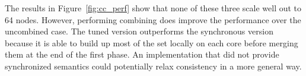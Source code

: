 The results in Figure~\ref{fig:cc_perf} show that none of these three scale well out to 64 nodes. However, performing combining does improve the performance over the uncombined case. The tuned version outperforms the synchronous version because it is able to build up most of the set locally on each core before merging them at the end of the first phase. An implementation that did not provide synchronized semantics could potentially relax consistency in a more general way.
